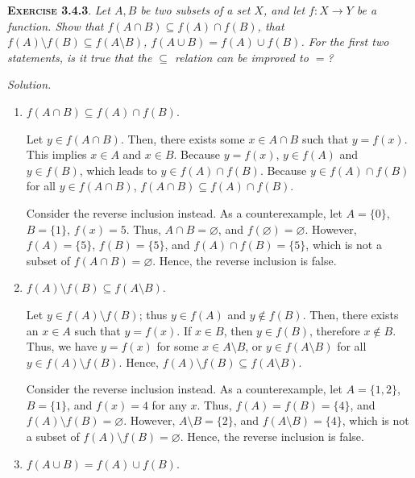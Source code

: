 \documentclass[12pt]{article}
\theoremstyle{remark}
\newenvironment{exer}[2]{
    \noindent \setlength{\parskip}{1em}%
    \textsc{\textbf{Exercise #1}}. \textit{#2} \par
    \noindent \textit{Solution.} %
}{\bigskip}
\begin{document}
\begin{exer}{3.4.3}{
    Let $A, B$ be two subsets of a set $X$, and let $f : X \to Y$ be a function.
    Show that $f(A \cap B) \subseteq f(A) \cap f(B)$, that $f(A) \setminus f(B) \subseteq f(A \setminus B)$, $f(A \cup B) = f(A) \cup f(B)$.
    For the first two statements, is it true that the $\subseteq$ relation can be improved to $=$?
}
    \begin{enumerate}[topsep=0mm, label=(\alph*)]
        \item $f(A \cap B) \subseteq f(A) \cap f(B)$.

            Let $y \in f(A \cap B)$.
            Then, there exists some $x \in A \cap B$ such that $y = f(x)$.
            This implies $x \in A$ and $x \in B$.
            Because $y = f(x)$, $y \in f(A)$ and $y \in f(B)$, which leads to $y \in f(A) \cap f(B)$.
            Because $y \in f(A) \cap f(B)$ for all $y \in f(A \cap B)$, $f(A \cap B) \subseteq f(A) \cap f(B)$.

            Consider the reverse inclusion instead.
            As a counterexample, let $A = \{ 0 \}$, $B = \{ 1 \}$, $f(x) = 5$.
            Thus, $A \cap B = \varnothing$, and $f(\varnothing) = \varnothing$.
            However, $f(A) = \{ 5 \}$, $f(B) = \{ 5 \}$, and $f(A) \cap f(B) = \{ 5 \}$, which is not a subset of $f(A \cap B) = \varnothing$.
            Hence, the reverse inclusion is false.

        \item $f(A) \setminus f(B) \subseteq f(A \setminus B)$.

            Let $y \in f(A) \setminus f(B)$; thus $y \in f(A)$ and $y \notin f(B)$.
            Then, there exists an $x \in A$ such that $y = f(x)$.
            If $x \in B$, then $y \in f(B)$, therefore $x \notin B$.
            Thus, we have $y = f(x)$ for some $x \in A \setminus B$, or $y \in f(A \setminus B)$ for all $y \in f(A) \setminus f(B)$.
            Hence, $f(A) \setminus f(B) \subseteq f(A \setminus B)$.

            Consider the reverse inclusion instead.
            As a counterexample, let $A = \{ 1, 2 \}$, $B = \{ 1 \}$, and $f(x) = 4$ for any $x$.
            Thus, $f(A) = f(B) = \{ 4 \}$, and $f(A) \setminus f(B) = \varnothing$.
            However, $A \setminus B = \{ 2 \}$, and $f(A \setminus B) = \{ 4 \}$, which is not a subset of $f(A) \setminus f(B) = \varnothing$.
            Hence, the reverse inclusion is false.

        \item $f(A \cup B) = f(A) \cup f(B)$.


\end{enumerate}
\end{exer}
\end{document}
